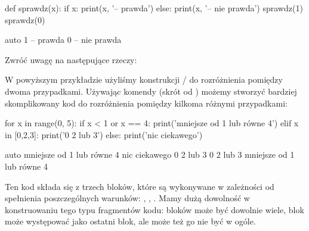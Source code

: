 \documentclass{pdfBooklets}
\begin{document}
\begin{CodeFrame}[python]{0.50\textwidth}
def sprawdz(x):
    if x:
        print(x, '-- prawda')
    else:
        print(x, '-- nie prawda')
sprawdz(1)
sprawdz(0)
\end{CodeFrame}
\begin{CodeFrame}{auto}
1 -- prawda
0 -- nie prawda
\end{CodeFrame}

\noindent Zwróć uwagę na następujące rzeczy:
W powyższym przykładzie użyliśmy konstrukcji / do rozróżnienia pomiędzy dwoma przypadkami.
Używając komendy  (skrót od ) możemy stworzyć bardziej skomplikowany kod do rozróżnienia pomiędzy kilkoma różnymi przypadkami:

\begin{CodeFrame}[python]{0.6\textwidth}
for x in range(0, 5):
    if x < 1 or x == 4:
        print('mniejsze od 1 lub równe 4')
    elif x in [0,2,3]:
        print('0 2 lub 3')
    else:
        print('nic ciekawego')
\end{CodeFrame}
\begin{CodeFrame}{auto}
mniejsze od 1 lub równe 4
nic ciekawego
0 2 lub 3
0 2 lub 3
mniejsze od 1 lub równe 4
\end{CodeFrame}

Ten kod składa się z trzech bloków, które są wykonywane w zależności od spełnienia poszczególnych warunków:
, , .
Mamy dużą dowolność w konstruowaniu tego typu fragmentów kodu: 
bloków  może być dowolnie wiele, blok  może występować jako ostatni blok,
ale może też go nie być w ogóle.
\end{document}

